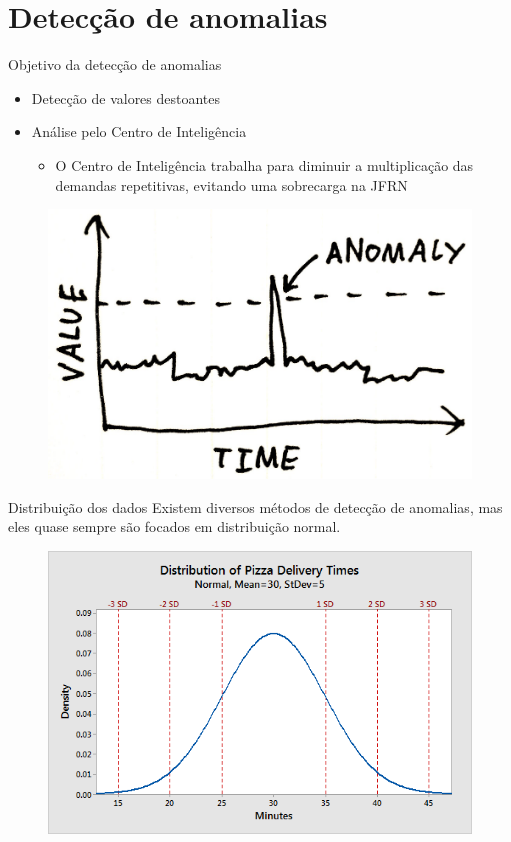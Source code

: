 \documentclass[10pt,t]{beamer}
\begin{document}
\section{Detecção de anomalias}

\begin{frame}{Objetivo da detecção de anomalias}
	\vspace{8pt}
	\begin{itemize}
		\item Detecção de valores destoantes
		\item Análise pelo Centro de Inteligência
		\begin{itemize}
			\item O Centro de Inteligência trabalha para diminuir a multiplicação das demandas repetitivas, evitando uma sobrecarga na JFRN
		\end{itemize}
	\end{itemize}
	\begin{figure}
		\centering
		\includegraphics[scale=0.20]{./imagens/detectando_anomalia.png}
	\end{figure}
\end{frame}

\begin{frame}{Distribuição dos dados}
	\vspace{8pt}
	Existem diversos métodos de detecção de anomalias, mas eles quase sempre são focados em distribuição normal.
	\begin{figure}
		\centering
		\includegraphics[scale=0.50]{./imagens/dist_normal.png}
	\end{figure}
\end{frame}
\end{document}
